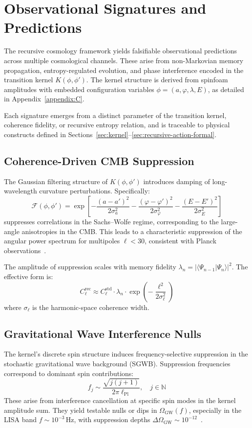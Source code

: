 
\section{Observational Signatures and Predictions}
\label{sec:observables}

The recursive cosmology framework yields falsifiable observational predictions across multiple cosmological channels. These arise from non-Markovian memory propagation, entropy-regulated evolution, and phase interference encoded in the transition kernel \( K(\phi, \phi') \). The kernel structure is derived from spinfoam amplitudes with embedded configuration variables \( \phi = (a, \varphi, \lambda, E) \), as detailed in Appendix~\ref{appendix:C}.

Each signature emerges from a distinct parameter of the transition kernel, coherence fidelity, or recursive entropy relation, and is traceable to physical constructs defined in Sections~\ref{sec:kernel}–\ref{sec:recursive-action-formal}.

\subsection{Coherence-Driven CMB Suppression}

The Gaussian filtering structure of \( K(\phi, \phi') \) introduces damping of long-wavelength curvature perturbations. Specifically:
\[
\mathcal{F}(\phi, \phi') = \exp\left[-\frac{(a - a')^2}{2\sigma_a^2} - \frac{(\varphi - \varphi')^2}{2\sigma_\varphi^2} - \frac{(E - E')^2}{2\sigma_E^2}\right]
\]
suppresses correlations in the Sachs–Wolfe regime, corresponding to the large-angle anisotropies in the CMB. This leads to a characteristic suppression of the angular power spectrum for multipoles \( \ell < 30 \), consistent with Planck observations~\cite{planck2019inflation}.

The amplitude of suppression scales with memory fidelity \( \lambda_n = |\langle \Psi_{n-1} | \Psi_n \rangle|^2 \). The effective form is:
\[
C_\ell^{\text{rec}} \approx C_\ell^{\text{std}} \cdot \lambda_n \cdot \exp\left(-\frac{\ell^2}{2\sigma_\ell^2}\right)
\]
where \( \sigma_\ell \) is the harmonic-space coherence width.

\subsection{Gravitational Wave Interference Nulls}

The kernel’s discrete spin structure induces frequency-selective suppression in the stochastic gravitational wave background (SGWB). Suppression frequencies correspond to dominant spin contributions:
\[
f_j \sim \frac{\sqrt{j(j+1)}}{2\pi \ell_{\text{Pl}}}, \quad j \in \mathbb{N}
\]
These arise from interference cancellation at specific spin modes in the kernel amplitude sum. They yield testable nulls or dips in \( \Omega_{\text{GW}}(f) \), especially in the LISA band \( f \sim 10^{-3} \,\text{Hz} \), with suppression depths \( \Delta \Omega_{\text{GW}} \sim 10^{-12} \)~\cite{amaroseoane2017laser}.

